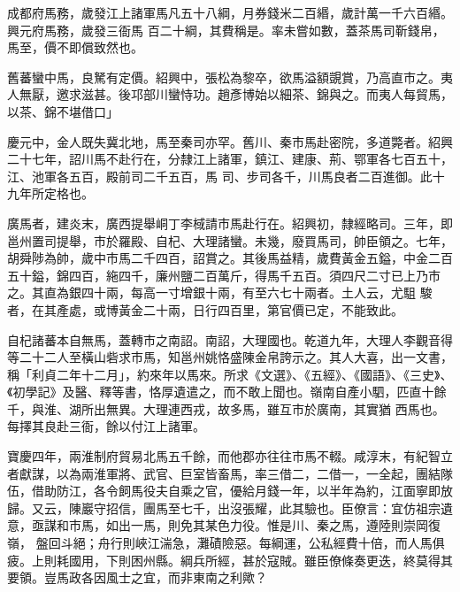 \begin{pinyinscope}
 成都府馬務，歲發江上諸軍馬凡五十八綱，月券錢米二百緡，歲計萬一千六百緡。興元府馬務，歲發三衙馬
 百二十綱，其費稱是。率未嘗如數，蓋茶馬司靳錢帛，馬至，價不即償致然也。



 舊蕃蠻中馬，良駑有定價。紹興中，張松為黎卒，欲馬溢額覬賞，乃高直市之。夷人無厭，邀求滋甚。後邛部川蠻恃功。趙彥博始以細茶、錦與之。而夷人每貿馬，以茶、錦不堪借口」



 慶元中，金人既失冀北地，馬至秦司亦罕。舊川、秦市馬赴密院，多道斃者。紹興二十七年，詔川馬不赴行在，分隸江上諸軍，鎮江、建康、荊、鄂軍各七百五十，江、池軍各五百，殿前司二千五百，馬
 司、步司各千，川馬良者二百進御。此十九年所定格也。



 廣馬者，建炎末，廣西提舉峒丁李棫請市馬赴行在。紹興初，隸經略司。三年，即邕州置司提舉，市於羅殿、自杞、大理諸蠻。未幾，廢買馬司，帥臣領之。七年，胡舜陟為帥，歲中市馬二千四百，詔賞之。其後馬益精，歲費黃金五鎰，中金二百五十鎰，錦四百，絁四千，廉州鹽二百萬斤，得馬千五百。須四尺二寸已上乃市之。其直為銀四十兩，每高一寸增銀十兩，有至六七十兩者。土人云，尤駔
 駿者，在其產處，或博黃金二十兩，日行四百里，第官價已定，不能致此。



 自杞諸蕃本自無馬，蓋轉市之南詔。南詔，大理國也。乾道九年，大理人李觀音得等二十二人至橫山砦求市馬，知邕州姚恪盛陳金帛誇示之。其人大喜，出一文書，稱「利貞二年十二月」，約來年以馬來。所求《文選》、《五經》、《國語》、《三史》、《初學記》及醫、釋等書，恪厚遺遣之，而不敢上聞也。嶺南自產小駟，匹直十餘千，與淮、湖所出無異。大理連西戎，故多馬，雖互市於廣南，其實猶
 西馬也。每擇其良赴三衙，餘以付江上諸軍。



 寶慶四年，兩淮制府貿易北馬五千餘，而他郡亦往往市馬不輟。咸淳末，有紀智立者獻謀，以為兩淮軍將、武官、巨室皆畜馬，率三借二，二借一，一全起，團結隊伍，借助防江，各令飼馬役夫自乘之官，優給月錢一年，以半年為約，江面寧即放歸。又云，陳巖守招信，團馬至七千，出沒張耀，此其驗也。臣僚言：宜仿祖宗遺意，亟謀和市馬，如出一馬，則免其某色力役。惟是川、秦之馬，遵陸則崇岡復嶺，
 盤回斗絕；舟行則峽江湍急，灘磧險惡。每綱運，公私經費十倍，而人馬俱疲。上則耗國用，下則困州縣。綱兵所經，甚於寇賊。雖臣僚條奏更迭，終莫得其要領。豈馬政各因風士之宜，而非東南之利歟？



\end{pinyinscope}